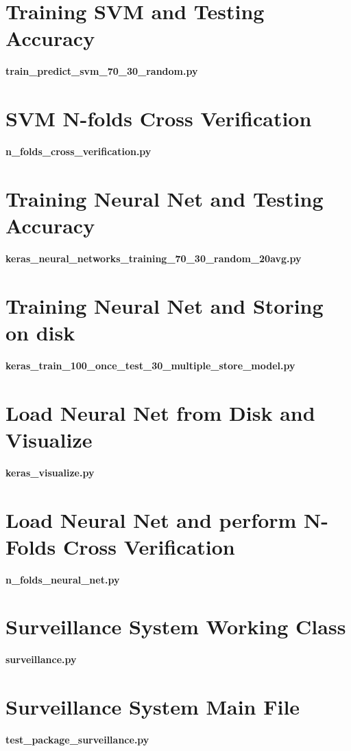 \section{Training SVM and Testing Accuracy}
\textbf{train\_predict\_svm\_70\_30\_random.py}

\section{SVM N-folds Cross Verification}
\textbf{n\_folds\_cross\_verification.py}

\section{Training Neural Net and Testing Accuracy}
\textbf{keras\_neural\_networks\_training\_70\_30\_random\_20avg.py}

\section{Training Neural Net and Storing on disk}
\textbf{keras\_train\_100\_once\_test\_30\_multiple\_store\_model.py}

\section{Load Neural Net from Disk and Visualize}
\textbf{keras\_visualize.py}

\section{Load Neural Net and perform N-Folds Cross Verification}
\textbf{n\_folds\_neural\_net.py}

\section{Surveillance System Working Class}
\textbf{surveillance.py}

\section{Surveillance System Main File}
\textbf{test\_package\_surveillance.py}
